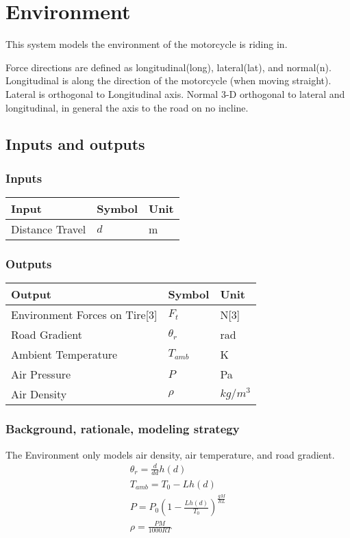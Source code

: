 \documentclass[../SimBALink.tex]{subfiles}
\begin{document}
\section{Environment} This system models the environment of the motorcycle is riding in.

Force directions are defined as longitudinal(long), lateral(lat), and normal(n). Longitudinal is along the direction of the motorcycle (when moving straight). Lateral is orthogonal to Longitudinal axis. Normal 3-D orthogonal to lateral and longitudinal, in general the axis to the road on no incline.

\subsection{Inputs and outputs}
	\subsubsection{Inputs}
	\begin{tabular}{ l | l | l  }
		Input					&	Symbol		&	Unit		\\	\hline
		Distance Travel			&	$d$			&	m
	\end{tabular}
	
	\subsubsection{Outputs}
	\begin{tabular}{ l | l | l  }
		Output							&	Symbol		&	Unit		\\	\hline
		Environment Forces on Tire[3]		&	$F_t$		&	N[3] \\
		Road Gradient						&	$\theta_r$	&	rad \\
		Ambient Temperature					&	$T_{amb}$	&  K \\
		Air Pressure						&	$P$  		& Pa \\
		Air Density 						&	$\rho$		& $kg/m^3$
	\end{tabular}

\subsubsection{Background, rationale, modeling strategy}
The Environment only models air density, air temperature, and road gradient.
	\begin{gather}
		\theta_r  = \frac{d}{dd} h(d) \\
		T_{amb} = T_0 - L h(d) \\
		P = P_0 \left( 1 - \frac{L h(d)}{T_0} \right)^{\frac{gM}{RL}}\\
		\rho = \frac{PM}{1000RT}  
\end{gather}
\end{document}
